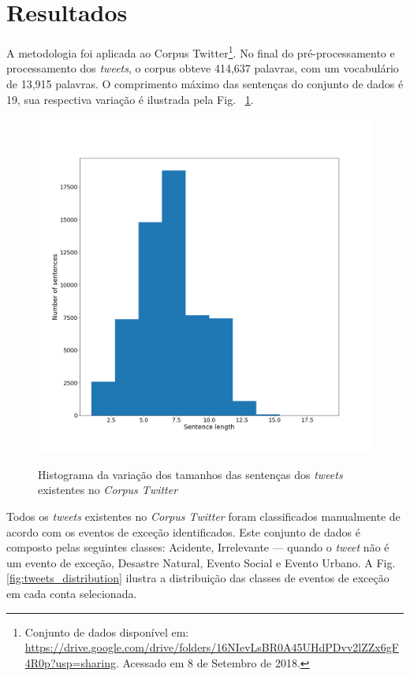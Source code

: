 \documentclass[
	12pt,				%
	oneside,			%
	a4paper,			%
	english,			%
	brazil				%
	]{abntex2ppgsi}
\begin{document}
{{\section{Resultados}
	
A metodologia foi aplicada ao Corpus Twitter\footnote{Conjunto de dados disponível em: \url{https://drive.google.com/drive/folders/16NIevLsBR0A45UHdPDvv2lZZx6gF4R0p?usp=sharing}. Acessado em 8 de Setembro de 2018.}. No final do pré-processamento e processamento dos \textit{tweets}, o corpus obteve 414,637 palavras, com um vocabulário de 13,915 palavras. O comprimento máximo das sentenças do conjunto de dados é 19, sua respectiva variação é ilustrada pela Fig. ~\ref{fig:corpus_metrics}.
 
\begin{figure}[!htb]
	\centering
 	  \caption{Histograma da variação dos tamanhos das sentenças dos \textit{tweets} existentes no \textit{Corpus Twitter}}
		\includegraphics[width=1\linewidth]{images/corpus_metrics.png}
	\label{fig:corpus_metrics}
\end{figure}

Todos os \textit{tweets} existentes no \textit{Corpus Twitter} foram classificados manualmente de acordo com os eventos de exceção identificados. Este conjunto de dados é composto pelas seguintes classes: Acidente, Irrelevante --- quando o \textit{tweet} não é um evento de exceção, Desastre Natural, Evento Social e Evento Urbano. A Fig. \ref{fig:tweets_distribution} ilustra a distribuição das classes de eventos de exceção em cada conta selecionada.

}}
\end{document}
